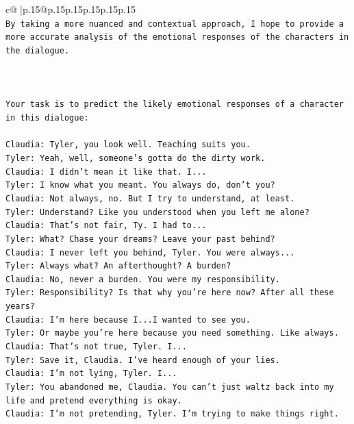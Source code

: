 \documentclass{article}
\begin{document}
{\begin{supertabular}{c@{$\;$}|p{.15\linewidth}@{}p{.15\linewidth}p{.15\linewidth}p{.15\linewidth}p{.15\linewidth}p{.15\linewidth}}
{{{\\ 
\texttt{By taking a more nuanced and contextual approach, I hope to provide a more accurate analysis of the emotional responses of the characters in the dialogue.} \\
\\ 
\\ 
\\ 
\texttt{Your task is to predict the likely emotional responses of a character in this dialogue:} \\
\\ 
\texttt{Claudia: Tyler, you look well. Teaching suits you.} \\
\texttt{Tyler: Yeah, well, someone's gotta do the dirty work.} \\
\texttt{Claudia: I didn't mean it like that. I...} \\
\texttt{Tyler: I know what you meant. You always do, don't you?} \\
\texttt{Claudia: Not always, no. But I try to understand, at least.} \\
\texttt{Tyler: Understand? Like you understood when you left me alone?} \\
\texttt{Claudia: That's not fair, Ty. I had to...} \\
\texttt{Tyler: What? Chase your dreams? Leave your past behind?} \\
\texttt{Claudia: I never left you behind, Tyler. You were always...} \\
\texttt{Tyler: Always what? An afterthought? A burden?} \\
\texttt{Claudia: No, never a burden. You were my responsibility.} \\
\texttt{Tyler: Responsibility? Is that why you're here now? After all these years?} \\
\texttt{Claudia: I'm here because I...I wanted to see you.} \\
\texttt{Tyler: Or maybe you're here because you need something. Like always.} \\
\texttt{Claudia: That's not true, Tyler. I...} \\
\texttt{Tyler: Save it, Claudia. I've heard enough of your lies.} \\
\texttt{Claudia: I'm not lying, Tyler. I...} \\
\texttt{Tyler: You abandoned me, Claudia. You can't just waltz back into my life and pretend everything is okay.} \\
\texttt{Claudia: I'm not pretending, Tyler. I'm trying to make things right.} \\
}}}
\end{supertabular}}
\end{document}
